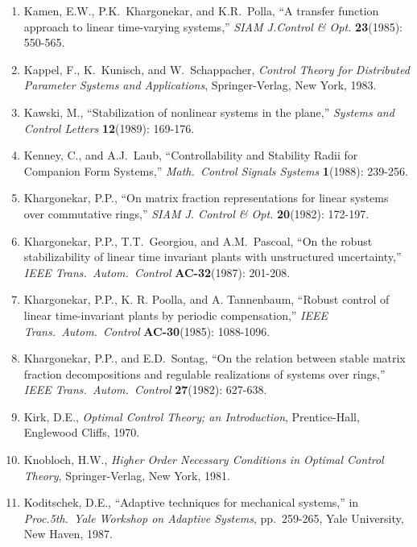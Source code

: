 \begin{enumerate}
\item
Kamen, E.W., P.K.\ Khargonekar, and K.R.\ Polla, ``A transfer function
approach to linear time-varying systems,'' {\it SIAM J.Control \& Opt.} {\bf
23}(1985): 550-565.

\item
Kappel, F., K.\ Kunisch, and W.\ Schappacher, {\it Control Theory for
Distributed Parameter Systems and Applications}, Springer-Verlag, New York,
1983.

\item
Kawski, M., ``Stabilization of nonlinear systems in the plane,'' {\it Systems
and Control Letters} {\bf 12}(1989): 169-176.

\item
Kenney, C., and A.J.\ Laub, ``Controllability and Stability Radii for
Companion Form Systems,'' {\it Math.\ Control Signals Systems} {\bf 1}(1988):
239-256.

\item
Khargonekar, P.P., ``On matrix fraction representations for linear systems
over commutative rings,'' {\it SIAM J. Control \& Opt.} {\bf 20}(1982):
172-197.

\item
Khargonekar, P.P., T.T.\ Georgiou, and A.M.\ Pascoal, ``On the robust
stabilizability of linear time invariant plants with unstructured
uncertainty,'' {\it IEEE Trans.\ Autom.\ Control} {\bf AC-32}(1987): 201-208.

\item
Khargonekar, P.P., K. R. Poolla, and A. Tannenbaum, ``Robust control of linear
time-invariant plants by periodic compensation,'' {\it IEEE Trans.\ Autom.\
Control} {\bf AC-30}(1985): 1088-1096.

\item
Khargonekar, P.P., and E.D.\ Sontag, ``On the relation between stable matrix
fraction decompositions and regulable realizations of systems over rings,''
{\it IEEE Trans.\ Autom.\ Control} {\bf 27}(1982): 627-638.

\item
Kirk, D.E., {\it Optimal Control Theory; an Introduction}, Prentice-Hall,
Englewood Cliffs, 1970.

\item
Knobloch, H.W., {\it Higher Order Necessary Conditions in Optimal Control
Theory}, Springer-Verlag, New York, 1981.

\item
Koditschek, D.E., ``Adaptive techniques for mechanical systems,'' in {\it
Proc.5th.\ Yale Workshop on Adaptive Systems}, pp.\ 259-265, Yale University,
New Haven, 1987.


\end{enumerate}
